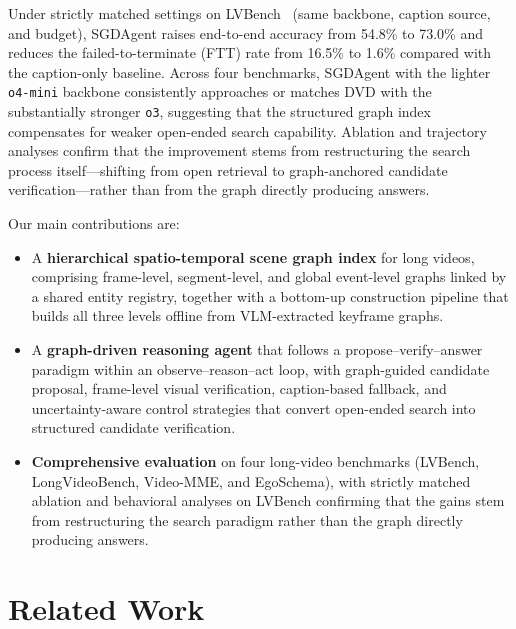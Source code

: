 \documentclass[sigconf, screen, review, anonymous]{acmart}
\begin{document}

Under strictly matched settings on LVBench~\cite{lvbench} (same backbone,
caption source, and budget), SGDAgent raises end-to-end accuracy from
54.8\% to 73.0\% and reduces the failed-to-terminate (FTT) rate from
16.5\% to 1.6\% compared with the caption-only baseline.  Across four
benchmarks, SGDAgent with the lighter \texttt{o4-mini} backbone
consistently approaches or matches DVD with the substantially stronger
\texttt{o3}, suggesting that the structured graph index compensates for
weaker open-ended search capability.  Ablation and trajectory analyses
confirm that the improvement stems from restructuring the search process
itself---shifting from open retrieval to graph-anchored candidate
verification---rather than from the graph directly producing answers.


Our main contributions are:
\begin{itemize}
\item A \textbf{hierarchical spatio-temporal scene graph index} for long
  videos, comprising frame-level, segment-level, and global event-level
  graphs linked by a shared entity registry, together with a bottom-up
  construction pipeline that builds all three levels offline from
  VLM-extracted keyframe graphs.

\item A \textbf{graph-driven reasoning agent} that follows a
  propose--verify--answer paradigm within an observe--reason--act loop,
  with graph-guided candidate proposal, frame-level visual verification,
  caption-based fallback, and uncertainty-aware control strategies that
  convert open-ended search into structured candidate verification.

\item \textbf{Comprehensive evaluation} on four long-video benchmarks
  (LVBench, LongVideoBench, Video-MME, and Ego\-Schema), with strictly
  matched ablation and behavioral analyses on LVBench confirming that the
  gains stem from restructuring the search paradigm rather than the graph
  directly producing answers.
\end{itemize}

\section{Related Work}
\label{sec:related}
 
\end{document}
